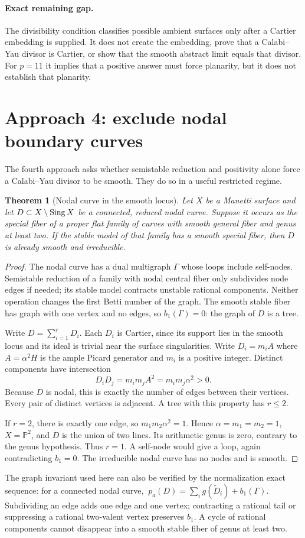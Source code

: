 \documentclass[11pt]{article}
\newtheorem{theorem}{Theorem}[section]
\theoremstyle{remark}\newtheorem{remark}[theorem]{Remark}
\newcommand{\PP}{\mathbb P}\newcommand{\CC}{\mathbb C}\newcommand{\ZZ}{\mathbb Z}
\begin{document}
\paragraph{Exact remaining gap.}
The divisibility condition classifies possible ambient surfaces only after a Cartier embedding is supplied. It does not create the embedding, prove that a Calabi--Yau divisor is Cartier, or show that the smooth abstract limit equals that divisor. For $p=11$ it implies that a positive answer must force planarity, but it does not establish that planarity.

\section{Approach 4: exclude nodal boundary curves}
The fourth approach asks whether semistable reduction and positivity alone force a Calabi--Yau divisor to be smooth. They do so in a useful restricted regime.

\begin{theorem}[Nodal curve in the smooth locus]\label{thm:nodal}
Let $X$ be a Manetti surface and let $D\subset X\setminus\operatorname{Sing} X$ be a connected, reduced nodal curve. Suppose it occurs as the special fiber of a proper flat family of curves with smooth general fiber and genus at least two. If the stable model of that family has a smooth special fiber, then $D$ is already smooth and irreducible.
\end{theorem}
\begin{proof}
The nodal curve has a dual multigraph $\Gamma$ whose loops include self-nodes. Semistable reduction of a family with nodal central fiber only subdivides node edges if needed; its stable model contracts unstable rational components. Neither operation changes the first Betti number of the graph. The smooth stable fiber has graph with one vertex and no edges, so $b_1(\Gamma)=0$: the graph of $D$ is a tree.

Write $D=\sum_{i=1}^rD_i$. Each $D_i$ is Cartier, since its support lies in the smooth locus and its ideal is trivial near the surface singularities. Write $D_i=m_iA$ where $A=\alpha^2H$ is the ample Picard generator and $m_i$ is a positive integer. Distinct components have intersection
\[
 D_iD_j=m_im_jA^2=m_im_j\alpha^2>0.
\]
Because $D$ is nodal, this is exactly the number of edges between their vertices. Every pair of distinct vertices is adjacent. A tree with this property has $r\leq2$.

If $r=2$, there is exactly one edge, so $m_1m_2\alpha^2=1$. Hence $\alpha=m_1=m_2=1$, $X=\PP^2$, and $D$ is the union of two lines. Its arithmetic genus is zero, contrary to the genus hypothesis. Thus $r=1$. A self-node would give a loop, again contradicting $b_1=0$. The irreducible nodal curve has no nodes and is smooth.
\end{proof}
The graph invariant used here can also be verified by the normalization exact sequence: for a connected nodal curve,
$\ p_a(D)=\sum_i g(\widetilde D_i)+b_1(\Gamma)$.
Subdividing an edge adds one edge and one vertex; contracting a rational tail or suppressing a rational two-valent vertex preserves $b_1$. A cycle of rational components cannot disappear into a smooth stable fiber of genus at least two.
\end{document}
